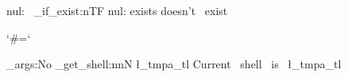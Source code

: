 \documentclass{article}
\begin{document}
\ExplSyntaxOn
  { nul:~ \file_if_exist:nTF { nul: } { exists } { doesn't~ exist } }
\ExplSyntaxOff

\begingroup
\catcode`\#=\the\catcode`\a
\xdef\x{}
\endgroup

\ExplSyntaxOn
\exp_args:No \sys_get_shell:nnN {\x} {} \l_tmpa_tl
 { Current~ shell~ is~ \l_tmpa_tl }
\ExplSyntaxOff
\end{document}
